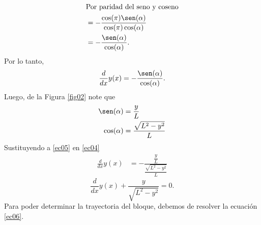 \begin{example}{}{}
\begin{solucion}
\begin{align*}
            \intertext{Por paridad del seno y coseno}
            & = -\frac{\cos(\pi)\sen(\alpha)}{\cos(\pi)\cos(\alpha)} \\
            & = -\frac{\sen(\alpha)}{\cos(\alpha)}.
        \end{align*}
        Por lo tanto,
        \begin{equation}
            \frac{d}{dx}y(x) = -\frac{\sen(\alpha)}{\cos(\alpha)}. \label{ec04}
        \end{equation}
        Luego, de la Figura \ref{fig02} note que
        \begin{equation} \label{ec05}
            \begin{aligned}
                \sen(\alpha) & = \frac{y}{L} \\
                \cos(\alpha) & = \frac{\sqrt{L^2 - y^2}}{L}
            \end{aligned}
        \end{equation}
        Sustituyendo a \eqref{ec05} en \eqref{ec04}
        \begin{align*}
            \frac{d}{dx}y(x) & = -\frac{\dfrac{y}{L}}{\dfrac{\sqrt{L^2 - y^2}}{L}}
        \end{align*}
        \begin{equation}
            \frac{d}{dx}y(x) + \frac{y}{\sqrt{L^2 - y^2}} = 0. \label{ec06}
        \end{equation}
        Para poder determinar la trayectoria del bloque, debemos de resolver la ecuación \eqref{ec06}.
    \end{solucion}
\end{example}
